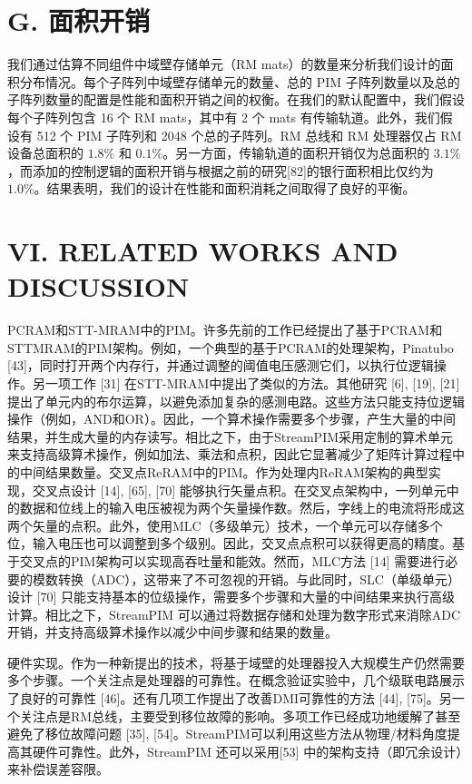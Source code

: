 \documentclass[10pt]{article}
\begin{document}
\section*{G. 面积开销}
我们通过估算不同组件中域壁存储单元（RM mats）的数量来分析我们设计的面积分布情况。每个子阵列中域壁存储单元的数量、总的 PIM 子阵列数量以及总的子阵列数量的配置是性能和面积开销之间的权衡。在我们的默认配置中，我们假设每个子阵列包含 16 个 RM mats，其中有 2 个 mats 有传输轨道。此外，我们假设有 512 个 PIM 子阵列和 2048 个总的子阵列。RM 总线和 RM 处理器仅占 RM 设备总面积的 $1.8 \%$ 和 $0.1 \%$。另一方面，传输轨道的面积开销仅为总面积的 $3.1 \%$，而添加的控制逻辑的面积开销与根据之前的研究[82]的银行面积相比仅约为 $1.0 \%$。结果表明，我们的设计在性能和面积消耗之间取得了良好的平衡。

\section*{VI. RELATED WORKS AND DISCUSSION}
PCRAM和STT-MRAM中的PIM。许多先前的工作已经提出了基于PCRAM和STTMRAM的PIM架构。例如，一个典型的基于PCRAM的处理架构，Pinatubo [43]，同时打开两个内存行，并通过调整的阈值电压感测它们，以执行位逻辑操作。另一项工作 [31] 在STT-MRAM中提出了类似的方法。其他研究 [6], [19], [21] 提出了单元内的布尔运算，以避免添加复杂的感测电路。这些方法只能支持位逻辑操作（例如，AND和OR）。因此，一个算术操作需要多个步骤，产生大量的中间结果，并生成大量的内存读写。相比之下，由于StreamPIM采用定制的算术单元来支持高级算术操作，例如加法、乘法和点积，因此它显著减少了矩阵计算过程中的中间结果数量。交叉点ReRAM中的PIM。作为处理内ReRAM架构的典型实现，交叉点设计 [14], [65], [70] 能够执行矢量点积。在交叉点架构中，一列单元中的数据和位线上的输入电压被视为两个矢量操作数。然后，字线上的电流将形成这两个矢量的点积。此外，使用MLC（多级单元）技术，一个单元可以存储多个位，输入电压也可以调整到多个级别。因此，交叉点点积可以获得更高的精度。基于交叉点的PIM架构可以实现高吞吐量和能效。然而，MLC方法 [14] 需要进行必要的模数转换（ADC），这带来了不可忽视的开销。与此同时，SLC（单级单元）设计 [70] 只能支持基本的位级操作，需要多个步骤和大量的中间结果来执行高级计算。相比之下，StreamPIM 可以通过将数据存储和处理为数字形式来消除ADC开销，并支持高级算术操作以减少中间步骤和结果的数量。

硬件实现。作为一种新提出的技术，将基于域壁的处理器投入大规模生产仍然需要多个步骤。一个关注点是处理器的可靠性。在概念验证实验中，几个级联电路展示了良好的可靠性 [46]。还有几项工作提出了改善DMI可靠性的方法 [44], [75]。另一个关注点是RM总线，主要受到移位故障的影响。多项工作已经成功地缓解了甚至避免了移位故障问题 [35], [54]。StreamPIM可以利用这些方法从物理/材料角度提高其硬件可靠性。此外，StreamPIM 还可以采用[53] 中的架构支持（即冗余设计）来补偿误差容限。
\end{document}
